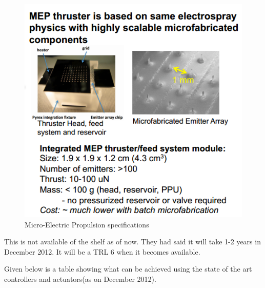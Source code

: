 \begin{figure}[!ht]
\begin{center}
\includegraphics[scale=0.7]{MEP_prop.png}
\caption{Micro-Electric Propulsion specifications}
\end{center}
\end{figure}

This is not available of the shelf as of now. They had said it will take 1-2 years in December 2012. It will be a TRL 6 when it becomes available.  

Given below is a table showing what can be achieved using the state of the art controllers and actuators(as on December 2012). 

